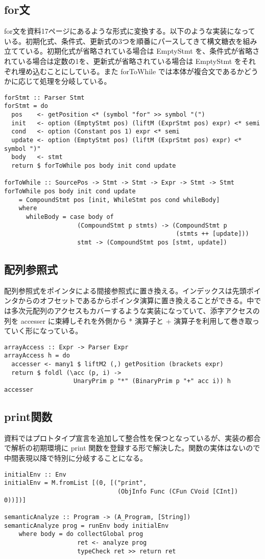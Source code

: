 \documentclass{jsarticle}
\begin{document}
\subsection{for文}
for文を資料17ページにあるような形式に変換する。以下のような実装になっている。初期化式、条件式、更新式の3つを順番にパースしてきて構文糖衣を組み立てている。初期化式が省略されている場合は EmptyStmt を、条件式が省略されている場合は定数の1を、更新式が省略されている場合は EmptyStmt をそれぞれ埋め込むことにしている。また forToWhile では本体が複合文であるかどうかに応じて処理を分岐している。
\begin{verbatim}
forStmt :: Parser Stmt
forStmt = do
  pos    <- getPosition <* (symbol "for" >> symbol "(")
  init   <- option (EmptyStmt pos) (liftM (ExprStmt pos) expr) <* semi
  cond   <- option (Constant pos 1) expr <* semi
  update <- option (EmptyStmt pos) (liftM (ExprStmt pos) expr) <* symbol ")"
  body   <- stmt
  return $ forToWhile pos body init cond update

forToWhile :: SourcePos -> Stmt -> Stmt -> Expr -> Stmt -> Stmt
forToWhile pos body init cond update
    = CompoundStmt pos [init, WhileStmt pos cond whileBody]
    where
      whileBody = case body of
                    (CompoundStmt p stmts) -> (CompoundStmt p
                                               (stmts ++ [update]))
                    stmt -> (CompoundStmt pos [stmt, update])
\end{verbatim}
\subsection{配列参照式}
配列参照式をポインタによる間接参照式に置き換える。インデックスは先頭ポインタからのオフセットであるからポインタ演算に置き換えることができる。中では多次元配列のアクセスもカバーするような実装になっていて、添字アクセスの列を accesser に束縛しそれを外側から * 演算子と + 演算子を利用して巻き取っていく形になっている。
\begin{verbatim}
arrayAccess :: Expr -> Parser Expr
arrayAccess h = do
  accesser <- many1 $ liftM2 (,) getPosition (brackets expr)
  return $ foldl (\acc (p, i) ->
                   UnaryPrim p "*" (BinaryPrim p "+" acc i)) h accesser
\end{verbatim}

\subsection{print関数}
資料ではプロトタイプ宣言を追加して整合性を保つとなっているが、実装の都合で解析の初期環境に print 関数を登録する形で解決した。関数の実体はないので中間表現以降で特別に分岐することになる。
\begin{verbatim}
initialEnv :: Env
initialEnv = M.fromList [(0, [("print",
                               (ObjInfo Func (CFun CVoid [CInt]) 0))])]

semanticAnalyze :: Program -> (A_Program, [String])
semanticAnalyze prog = runEnv body initialEnv
    where body = do collectGlobal prog
                    ret <- analyze prog
                    typeCheck ret >> return ret
\end{verbatim}
\end{document}
